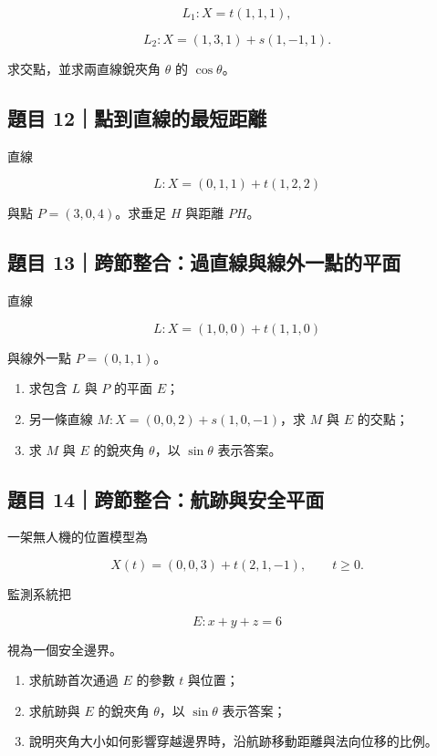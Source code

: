 \documentclass[11pt,a4paper]{article}
\providecommand{\tightlist}{%
  \setlength{\itemsep}{0pt}\setlength{\parskip}{0pt}}
\begin{document}
\[
L_1:X=t(1,1,1),
\]

\[
L_2:X=(1,3,1)+s(1,-1,1).
\]

求交點，並求兩直線銳夾角 \(\theta\) 的 \(\cos\theta\)。

\subsection{題目 12｜點到直線的最短距離}\label{ux984cux76ee-12ux9edeux5230ux76f4ux7ddaux7684ux6700ux77edux8dddux96e2}

直線

\[
L:X=(0,1,1)+t(1,2,2)
\]

與點 \(P=(3,0,4)\)。求垂足 \(H\) 與距離 \(PH\)。

\subsection{題目 13｜跨節整合：過直線與線外一點的平面}\label{ux984cux76ee-13ux8de8ux7bc0ux6574ux5408ux904eux76f4ux7ddaux8207ux7ddaux5916ux4e00ux9edeux7684ux5e73ux9762}

直線

\[
L:X=(1,0,0)+t(1,1,0)
\]

與線外一點 \(P=(0,1,1)\)。

\begin{enumerate}
\def\labelenumi{\arabic{enumi}.}
\tightlist
\item
  求包含 \(L\) 與 \(P\) 的平面 \(E\)；
\item
  另一條直線 \(M:X=(0,0,2)+s(1,0,-1)\)，求 \(M\) 與 \(E\) 的交點；
\item
  求 \(M\) 與 \(E\) 的銳夾角 \(\theta\)，以 \(\sin\theta\) 表示答案。
\end{enumerate}

\subsection{題目 14｜跨節整合：航跡與安全平面}\label{ux984cux76ee-14ux8de8ux7bc0ux6574ux5408ux822aux8de1ux8207ux5b89ux5168ux5e73ux9762}

一架無人機的位置模型為

\[
X(t)=(0,0,3)+t(2,1,-1),\qquad t\ge 0.
\]

監測系統把

\[
E:x+y+z=6
\]

視為一個安全邊界。

\begin{enumerate}
\def\labelenumi{\arabic{enumi}.}
\tightlist
\item
  求航跡首次通過 \(E\) 的參數 \(t\) 與位置；
\item
  求航跡與 \(E\) 的銳夾角 \(\theta\)，以 \(\sin\theta\) 表示答案；
\item
  說明夾角大小如何影響穿越邊界時，沿航跡移動距離與法向位移的比例。
\end{enumerate}
\end{document}
